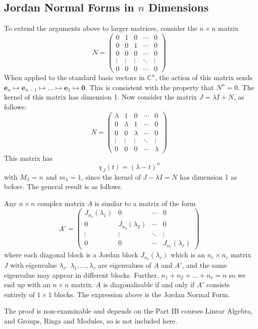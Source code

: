 \documentclass{article}
\begin{document}
\subsection{Jordan Normal Forms in $n$ Dimensions}
To extend the arguments above to larger matrices, consider the $n\times n$ matrix
\[ N = \begin{pmatrix}
		0      & 1      & 0      & \cdots & 0      \\
		0      & 0      & 1      & \cdots & 0      \\
		0      & 0      & 0      & \cdots & 0      \\
		\vdots & \vdots & \vdots & \ddots & \vdots \\
		0      & 0      & 0      & \cdots & 0
	\end{pmatrix} \]
When applied to the standard basis vectors in $\mathbb C^n$, the action of this matrix sends $\bm e_n \mapsto \bm e_{n-1} \mapsto \dots \mapsto \bm e_1 \mapsto \bm 0$. This is consistent with the property that $N^n = 0$. The kernel of this matrix has dimension 1. Now consider the matrix $J = \lambda I + N$, as follows:
\[ N = \begin{pmatrix}
		\lambda & 1       & 0       & \cdots & 0       \\
		0       & \lambda & 1       & \cdots & 0       \\
		0       & 0       & \lambda & \cdots & 0       \\
		\vdots  & \vdots  & \vdots  & \ddots & \vdots  \\
		0       & 0       & 0       & \cdots & \lambda
	\end{pmatrix} \]
This matrix has
\[ \chi_J(t) = (\lambda - t)^n \]
with $M_\lambda = n$ and $m_\lambda = 1$, since the kernel of $J - \lambda I = N$ has dimension 1 as before. The general result is as follows.
\begin{theorem}
	Any $n\times n$ complex matrix $A$ is similar to a matrix of the form
	\[ A' = \left( \begin{array}{c|c|c|c}
				J_{n_1}(\lambda_1) & 0                  & \cdots & 0                  \\\hline
				0                  & J_{n_2}(\lambda_2) & \cdots & 0                  \\\hline
				\vdots             & \vdots             & \ddots & \vdots             \\\hline
				0                  & 0                  & \cdots & J_{n_r}(\lambda_r)
			\end{array} \right) \]
	where each diagonal block is a Jordan block $J_{n_r}(\lambda_r)$ which is an $n_r \times n_r$ matrix $J$ with eigenvalue $\lambda_r$. $\lambda_1, \dots, \lambda_r$ are eigenvalues of $A$ and $A'$, and the same eigenvalue may appear in different blocks. Further, $n_1 + n_2 + \dots + n_r = n$ so we end up with an $n \times n$ matrix. $A$ is diagonalisable if and only if $A'$ consists entirely of $1 \times 1$ blocks. The expression above is the Jordan Normal Form.
\end{theorem}
The proof is non-examinable and depends on the Part IB courses Linear Algebra, and Groups, Rings and Modules, so is not included here.
\end{document}
